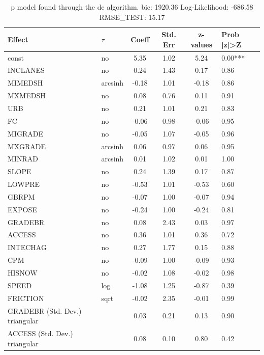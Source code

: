 \begin{table}
	\caption{p model found through the de algorithm. bic: 1920.36 Log-Likelihood: -686.58 RMSE_TEST: 15.17}
	\begin{center}
		\begin{tabular}{|l|l|c|c|c|l|}
			\hline
			Effect & $\tau$ & Coeff & Std. Err & z-values & Prob |z|>Z \\
			\hline
			const & no & 5.35 & 1.02 & 5.24 & 0.00*** \\
			\hline
			INCLANES & no & 0.24 & 1.43 & 0.17 & 0.86 \\
			\hline
			MIMEDSH & arcsinh & -0.18 & 1.01 & -0.18 & 0.86 \\
			\hline
			MXMEDSH & no & 0.08 & 0.76 & 0.11 & 0.91 \\
			\hline
			URB & no & 0.21 & 1.01 & 0.21 & 0.83 \\
			\hline
			FC & no & -0.06 & 0.98 & -0.06 & 0.95 \\
			\hline
			MIGRADE & no & -0.05 & 1.07 & -0.05 & 0.96 \\
			\hline
			MXGRADE & arcsinh & 0.06 & 0.97 & 0.06 & 0.95 \\
			\hline
			MINRAD & arcsinh & 0.01 & 1.02 & 0.01 & 1.00 \\
			\hline
			SLOPE & no & 0.24 & 1.39 & 0.17 & 0.87 \\
			\hline
			LOWPRE & no & -0.53 & 1.01 & -0.53 & 0.60 \\
			\hline
			GBRPM & no & -0.07 & 1.00 & -0.07 & 0.94 \\
			\hline
			EXPOSE & no & -0.24 & 1.00 & -0.24 & 0.81 \\
			\hline
			GRADEBR & no & 0.08 & 2.43 & 0.03 & 0.97 \\
			\hline
			ACCESS & no & 0.36 & 1.01 & 0.36 & 0.72 \\
			\hline
			INTECHAG & no & 0.27 & 1.77 & 0.15 & 0.88 \\
			\hline
			CPM & no & -0.09 & 1.00 & -0.09 & 0.93 \\
			\hline
			HISNOW & no & -0.02 & 1.08 & -0.02 & 0.98 \\
			\hline
			SPEED & log & -1.08 & 1.25 & -0.87 & 0.39 \\
			\hline
			FRICTION & sqrt & -0.02 & 2.35 & -0.01 & 0.99 \\
			\hline
			GRADEBR (Std. Dev.) triangular &  & 0.03 & 0.21 & 0.13 & 0.90 \\
			\hline
			ACCESS (Std. Dev.) triangular &  & 0.08 & 0.10 & 0.80 & 0.42 \\
			\hline

\end{tabular}
\end{center}
\end{table}
